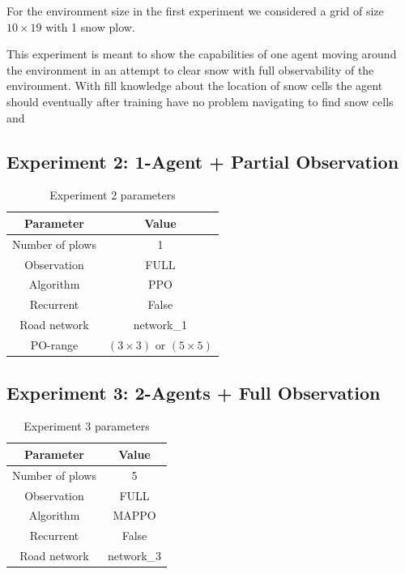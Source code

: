 \documentclass{scrartcl}
\theoremstyle{mytheoremstyle}
\theoremstyle{mytheoremstyle}
\theoremstyle{myproblemstyle}
\begin{document}
For the environment size in the first experiment we considered a grid of size $10 \times 19$ with 1 snow plow.

This experiment is meant to show the capabilities of one agent moving around the environment in an attempt to clear snow with full observability of the environment. With fill knowledge about the location of snow cells the agent should eventually after training have no problem navigating to find snow cells and



\subsection{Experiment 2: 1-Agent + Partial Observation}
\begin{table}[H]
    \centering
    \begin{tabular}{|c|c|}
        \hline
        \textbf{Parameter} & \textbf{Value}                   \\\hline
        Number of plows    & 1                                \\\hline
        Observation        & FULL                             \\\hline
        Algorithm          & PPO                              \\\hline
        Recurrent          & False                            \\\hline
        Road network       & network\_1                       \\\hline
        PO-range           & $(3 \times 3)$ or $(5 \times 5)$ \\\hline
    \end{tabular}
    \caption{Experiment 2 parameters}
    \label{tab:exp2}
\end{table}


\subsection{Experiment 3: 2-Agents + Full Observation}
\begin{table}[H]
    \centering
    \begin{tabular}{|c|c|}
        \hline
        \textbf{Parameter} & \textbf{Value} \\\hline
        Number of plows    & 5              \\\hline
        Observation        & FULL           \\\hline
        Algorithm          & MAPPO          \\\hline
        Recurrent          & False          \\\hline
        Road network       & network\_3     \\\hline
    \end{tabular}
    \caption{Experiment 3 parameters}
    \label{tab:exp3}
\end{table}
\end{document}
